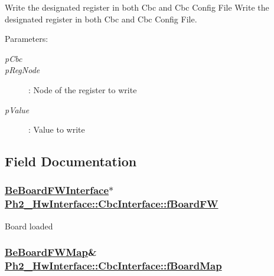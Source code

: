 Write the designated register in both Cbc and Cbc Config File Write the designated register in both Cbc and Cbc Config File. 

\begin{Desc}
\item[Parameters:]
\begin{description}
\item[{\em p\-Cbc}]\item[{\em p\-Reg\-Node}]: Node of the register to write \item[{\em p\-Value}]: Value to write \end{description}
\end{Desc}


\subsection{Field Documentation}
\hypertarget{class_ph2___hw_interface_1_1_cbc_interface_8c37c0f580a1918fc11a207aff085a72}{
\subsubsection[fBoardFW]{\setlength{\rightskip}{0pt plus 5cm}\hyperlink{class_ph2___hw_interface_1_1_be_board_f_w_interface}{Be\-Board\-FWInterface}$\ast$ \hyperlink{class_ph2___hw_interface_1_1_cbc_interface_8c37c0f580a1918fc11a207aff085a72}{Ph2\_\-Hw\-Interface::Cbc\-Interface::f\-Board\-FW}}}
\label{class_ph2___hw_interface_1_1_cbc_interface_8c37c0f580a1918fc11a207aff085a72}


Board loaded \hypertarget{class_ph2___hw_interface_1_1_cbc_interface_0e34094468be36ee2c65e15f72178303}{
\subsubsection[fBoardMap]{\setlength{\rightskip}{0pt plus 5cm}\hyperlink{namespace_ph2___hw_interface_59fe3165f25ded62b5b12cf0ebc69e8d}{Be\-Board\-FWMap}\& \hyperlink{class_ph2___hw_interface_1_1_cbc_interface_0e34094468be36ee2c65e15f72178303}{Ph2\_\-Hw\-Interface::Cbc\-Interface::f\-Board\-Map}}}
\label{class_ph2___hw_interface_1_1_cbc_interface_0e34094468be36ee2c65e15f72178303}



